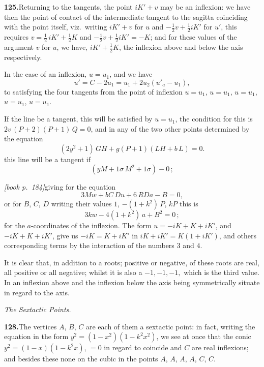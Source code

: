 \documentclass[11pt,a4paper]{article}
\begin{document}
\medskip\noindent\textbf{125.}\quad Returning to the tangents, the point $iK' + v$ may be an inflexion: we have then the point of contact of the intermediate tangent to the sagitta coinciding with the point itself, viz.\ writing $iK' + v$ for $u$ and $-\tfrac{1}{2}v + \tfrac{1}{2}iK'$ for $u'$, this requires $v = \tfrac{1}{2}\,iK' + \tfrac{1}{2}K$ and $-\tfrac{1}{2}v + \tfrac{1}{2}iK' = -K$; and for these values of the argument $v$ for $u$, we have, $iK' + \tfrac{1}{2}K$, the inflexion above and below the axis respectively.

In the case of an inflexion, $u = u_1$, and we have
\[
u' = C - 2u_1 = u_1 + 2u_2(u'_a - u_1),
\]
to satisfying the four tangents from the point of inflexion $u = u_1$, $u = u_1$, $u = u_1$, $u = u_1$, $u = u_1$.

If the line be a tangent, this will be satisfied by $u = u_1$, the condition for this is $2v\,(P + 2)(P + 1)\,Q = 0$, and in any of the two other points determined by the equation
\[
(2y^2 + 1)\,GH + g(P + 1)(LH + b\,L) = 0.
\]
this line will be a tangent if
\[
(yM + 1\sigma\,M^2 + 1\sigma) - 0\,;
\]

\medskip\noindent\textit{[book p.~184]}\quad giving for the equation
\[
3Mw + bC\,Du + 6\,RDa - B = 0,
\]
or for $B$, $C$, $D$ writing their values $1$, $-(1 + k^2)\,P$, $kP$ this is
\[
3kw - 4(1 + k^2)\,a + B^2 = 0\,;
\]
for the $a$-coordinates of the inflexion. The form $u = -i K + K + iK'$, and $-i K + K + iK'$, give us $-i K = K + iK'$ in $i K + iK' = K(1 + iK')$, and others corresponding terms by the interaction of the numbers $3$ and $4$.

It is clear that, in addition to a roots; positive or negative, of these roots are real, all positive or all negative; whilst it is also a $-1, -1, -1, $ which is the third value. In an inflexion above and the inflexion below the axis being symmetrically situate in regard to the axis.

\medskip\noindent\textit{The Sextactic Points.}

\medskip\noindent\textbf{128.}\quad The vertices $A$, $B$, $C$ are each of them a sextactic point: in fact, writing the equation in the form $y^2 = (1 - x^2)(1 - k^2 x^2)$, we see at once that the conic $y^2 = (1 - x)(1 - k^2 x)$, $= 0$ in regard to coincide and $C$ are real inflexions; and besides these none on the cubic in the points $A$, $A$, $A$, $A$, $C$, $C$.
\end{document}
